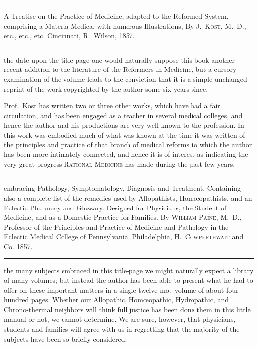 
\fancybreak{* * *}

\footnotesize
{}  A Treatise on the Practice of Medicine, adapted to the Reformed
System, comprising a Materia Medica, with numerous Illustrations, By \textsc{J.~Kost, M.~D.}, etc., etc., etc. Cincinnati, R.~Wilson, 1857.
\plainbreak{1}
\normalsize

 the date upon the title page one would naturally suppose this
book another recent addition to the literature of the Reformers in Medicine,
but a cursory examination of the volume leads to the conviction
that it is a simple unchanged reprint of the work copyrighted by the
author some six years since.

Prof.\ Kost has written two or three other works, which have had
a fair circulation, and has been engaged as a teacher in several
medical colleges, and hence the author and his productions are very
well known to the profession. In this work was embodied much of what
was known at the time it was written of the principles and practice of
that branch of medical reforms to which the author has been more intimately
connected, and hence it is of interest as indicating the very
great progress \textsc{Rational Medicine} has made during the past few years.

\fancybreak{* * *}

\footnotesize
{} embracing Pathology, Symptomatology,
Diagnosis and Treatment. Containing also a complete list of the remedies used
by Allopathists, Homœopathists, and an Eclectic Pharmacy and Glossary. Designed
for Physicians, the Student of Medicine, and as a Domestic Practice for Families. By
\textsc{William Paine}, M.~D., Professor of the Principles and Practice of Medicine and Pathology
in the Eclectic Medical College of Pennsylvania. Philadelphia, \textsc{H.~Cowperthwait}
and Co. 1857.
\plainbreak{1}
\normalsize

 the many subjects embraced in this title-page we might naturally
expect a library of many volumes; but instead the author has been
able to present what he had to offer on these important matters in a
single twelve-mo.\ volume of about four hundred pages. Whether our
Allopathic, Homœopathic, Hydropathic, and Chrono-thermal neighbors
will think full justice has been done them in this little manual or not,
we cannot determine. We are sure, however, that physicians, students
and families will agree with us in regretting that the majority of the
subjects have been so briefly considered.


